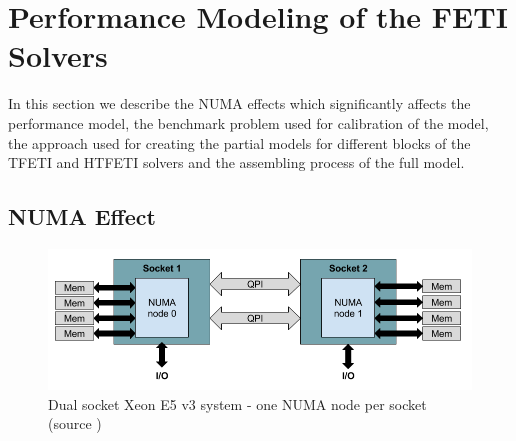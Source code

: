 \section{Performance Modeling of the FETI Solvers }

In this section we describe the NUMA effects which significantly affects the performance model, the benchmark problem used for calibration of the model, the approach used for creating the partial models for different blocks of the TFETI and HTFETI solvers and the assembling process of the full model. 

\subsection{NUMA Effect}
\label{sec:numa}






\begin{figure}[!thb]
\centering
\includegraphics[scale=0.4]{figures/numa.png}
\caption{Dual socket Xeon E5 v3 system - one NUMA node per socket (source \cite{molka2015cache})}
\label{fig:haswellDualSocket}
\end{figure}


